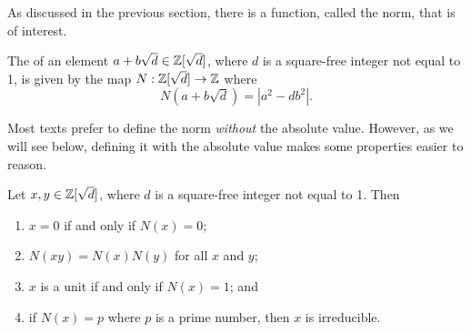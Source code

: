 As discussed in the previous section, there is a function, called the norm, that is of interest.
\begin{definition}
    The  of an element $a+b\sqrt{d} \in \mathbb{Z}[\sqrt{d}]$, where $d$ is a square-free integer not equal to 1, is given by the map $N: \mathbb{Z}[\sqrt{d}] \to \mathbb{Z}$ where
    \[
        N(a+b\sqrt{d}) = |a^2-db^2|.
    \]
\end{definition}
\begin{remark}
    Most texts prefer to define the norm \textit{without} the absolute value. However, as we will see below, defining it with the absolute value makes some properties easier to reason.
\end{remark}

\begin{proposition}\label{prop-properties-of-quadratic-integer-norm}
    Let $x,y \in \mathbb{Z}[\sqrt{d}]$, where $d$ is a square-free integer not equal to 1. Then
    \begin{enumerate}
        \item $x = 0$ if and only if $N(x) = 0$;
        \item $N(xy) = N(x)N(y)$ for all $x$ and $y$;
        \item $x$ is a unit if and only if $N(x) = 1$; and
        \item if $N(x) = p$ where $p$ is a prime number, then $x$ is irreducible.
    \end{enumerate}
\end{proposition}
